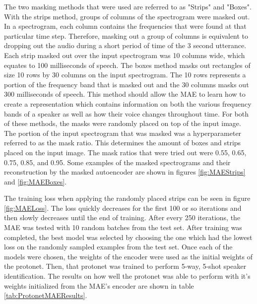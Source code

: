 \documentclass{article}
\begin{document}
The two masking methods that were used are referred to as "Strips" and "Boxes". With the strips method, groups of columns
of the spectrogram were masked out. In a spectrogram, each column contains the frequencies that were found at that particular
time step. Therefore, masking out a group of columns is equivalent to dropping out the audio during a short period of time
of the 3 second utterance. Each strip masked out over the input spectrogram was 10 columns wide, which equates to 100 milliseconds
of speech. The boxes method masks out rectangles of size 10 rows by 30 columns on the input spectrogram. The 10 rows represents
a portion of the frequency band that is masked out and the 30 columns masks out 300 milliseconds of speech. This method
should allow the MAE to learn how to create a representation which contains information on both the various frequency
bands of a speaker as well as how their voice changes throughout time. For both of these methods, the masks were randomly
placed on top of the input image. The portion of the input spectrogram that was masked was a hyperparameter referred to
as the mask ratio. This determines the amount of boxes and strips placed on the input image. The mask ratios that were 
tried out were 0.55, 0.65, 0.75, 0.85, and 0.95. Some examples of the masked spectrograms and their reconstruction by
the masked autoencoder are shown in figures \ref{fig:MAEStrips} and \ref{fig:MAEBoxes}.

The training loss when applying the randomly placed strips can be seen in figure \ref{fig:MAELoss}. The loss quickly decreases
for the first 100 or so iterations and then slowly decreases until the end of training. After every 250 iterations, the MAE
was tested with 10 random batches from the test set. After training was completed, the best model was selected by choosing
the one which had the lowest loss on the randomly sampled examples from the test set. Once each of the models were chosen,
the weights of the encoder were used as the initial weights of the protonet. Then, that protonet was trained to perform 
5-way, 5-shot speaker identification. The results on how well the protonet was able to perform with it's weights initialized
from the MAE's encoder are shown in table \ref{tab:ProtonetMAEResults}.
\end{document}
